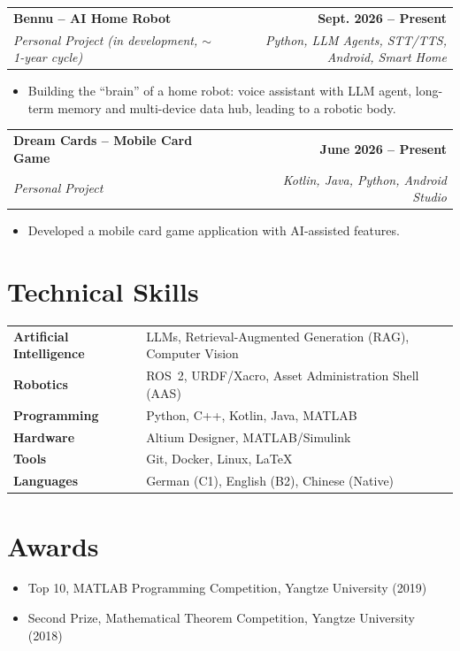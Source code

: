 \documentclass[a4paper,11pt]{article}
\makeatletter
\newcommand{\resumeEntry}[5]{
\vspace{1.5mm}
\noindent
\begin{tabular*}{\textwidth}{@{\extracolsep{\fill}}lr}
\textbf{#1} & \textbf{\color{darkblue}#4} \\
\textit{#3} & \textit{\small #5} \\
\end{tabular*}
\par
\ifstrempty{#2}{}{%
\vspace{0.4mm}
\noindent
{\small \faGithub\ \href{https://#2}{#2}}
\par
}
}
\makeatother
\begin{document}
\resumeEntry
{Bennu -- AI Home Robot}
{}
{Personal Project (in development, $\sim$1-year cycle)}
{Sept. 2026 -- Present}
{Python, LLM Agents, STT/TTS, Android, Smart Home}

\begin{itemize}
\item Building the ``brain'' of a home robot: voice assistant with LLM agent, long-term memory and multi-device data hub, leading to a robotic body.
\end{itemize}

\resumeEntry
{Dream Cards -- Mobile Card Game}
{}
{Personal Project}
{June 2026 -- Present}
{Kotlin, Java, Python, Android Studio}

\begin{itemize}
\item Developed a mobile card game application with AI-assisted features.
\end{itemize}


\section{Technical Skills}

\begin{tabular}{@{}ll@{}}

\textbf{Artificial Intelligence} &
LLMs, Retrieval-Augmented Generation (RAG), Computer Vision \\

\textbf{Robotics} &
ROS~2, URDF/Xacro, Asset Administration Shell (AAS) \\

\textbf{Programming} &
Python, C++, Kotlin, Java, MATLAB \\

\textbf{Hardware} &
Altium Designer, MATLAB/Simulink \\

\textbf{Tools} &
Git, Docker, Linux, \LaTeX \\

\textbf{Languages} &
German (C1), English (B2), Chinese (Native) \\

\end{tabular}


\section{Awards}

\begin{itemize}
\item Top 10, MATLAB Programming Competition, Yangtze University (2019)
\item Second Prize, Mathematical Theorem Competition, Yangtze University (2018)
\end{itemize}
\end{document}
